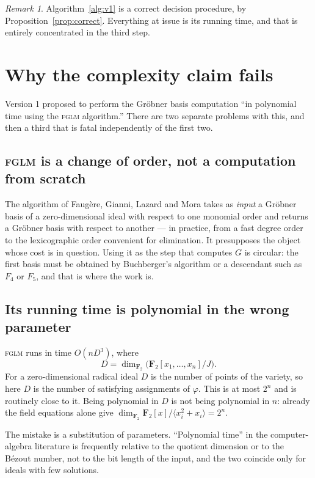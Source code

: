 \documentclass[11pt]{article}
\theoremstyle{plain}
\theoremstyle{definition}
\theoremstyle{remark}
\newtheorem{remark}[theorem]{Remark}
\newcommand{\FF}{\mathbf{F}_{2}}
\begin{document}
\begin{remark}
Algorithm~\ref{alg:v1} is a correct decision procedure, by
Proposition~\ref{prop:correct}. Everything at issue is its running time, and
that is entirely concentrated in the third step.
\end{remark}

\section{Why the complexity claim fails}

Version 1 proposed to perform the Gr\"obner basis computation ``in polynomial
time using the \textsc{fglm} algorithm.'' There are two separate problems with
this, and then a third that is fatal independently of the first two.

\subsection{\textsc{fglm} is a change of order, not a computation from scratch}

The algorithm of Faug\`ere, Gianni, Lazard and Mora \cite{fglm} takes as
\emph{input} a Gr\"obner basis of a zero-dimensional ideal with respect to one
monomial order and returns a Gr\"obner basis with respect to another --- in
practice, from a fast degree order to the lexicographic order convenient for
elimination. It presupposes the object whose cost is in question. Using it as
the step that computes $G$ is circular: the first basis must be obtained by
Buchberger's algorithm or a descendant such as $F_{4}$ or $F_{5}$, and that is
where the work is.

\subsection{Its running time is polynomial in the wrong parameter}

\textsc{fglm} runs in time $O(nD^{3})$, where
\[
D=\dim_{\FF}\bigl(\FF[x_{1},\dots,x_{n}]/J\bigr).
\]
For a zero-dimensional radical ideal $D$ is the number of points of the
variety, so here $D$ is the number of satisfying assignments of $\varphi$.
This is at most $2^{n}$ and is routinely close to it. Being polynomial in $D$
is not being polynomial in $n$: already the field equations alone give
$\dim_{\FF}\FF[x]/\langle x_{i}^{2}+x_{i}\rangle=2^{n}$.

The mistake is a substitution of parameters. ``Polynomial time'' in the
computer-algebra literature is frequently relative to the quotient dimension or
to the B\'ezout number, not to the bit length of the input, and the two
coincide only for ideals with few solutions.
\end{document}
